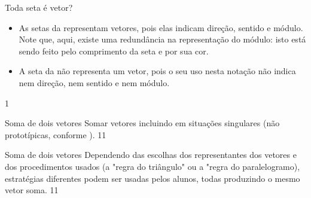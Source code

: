 \clearmargin
\begin{answer}{Toda seta é vetor?}
{
\begin{itemize}
\item {} 
As setas da \hyperref[\detokenize{GE101-0C:fig-geometria-flechas-03}]{}  representam vetores, pois elas indicam direção, sentido e módulo. Note que, aqui, existe uma redundância na representação do módulo: isto está sendo feito pelo comprimento da seta e por sua cor.

\item {} 
A seta da \hyperref[\detokenize{GE101-0C:fig-geometria-flechas-08}]{} não representa um vetor, pois o seu uso nesta notação não indica nem direção, nem sentido e nem módulo.
\end{itemize}
}{1}
\end{answer}
\begin{objectives}{Soma de dois vetores}
{
Somar vetores incluindo em situações singulares (não prototípicas, conforme \citet{poynter2005}).
}{1}{1}
\end{objectives}
\begin{sugestions}{Soma de dois vetores}
{
Dependendo das escolhas dos representantes dos vetores e dos procedimentos usados (a "regra do triângulo"{} ou a "regra do paralelogramo), estratégias diferentes podem ser usadas pelos alunos, todas produzindo o mesmo vetor soma.
}{1}{1}
\end{sugestions}
